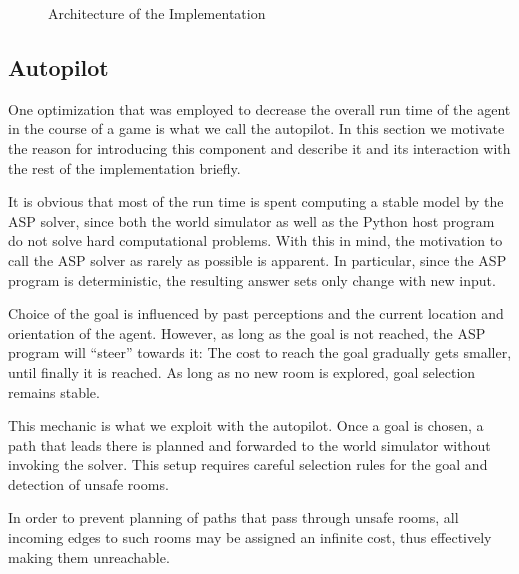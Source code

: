 \documentclass{llncs}
\begin{document}
\begin{figure}
\begin{center}

\end{center}
\caption{Architecture of the Implementation}
\label{fig:architecture}
\end{figure}

\subsection{Autopilot}

One optimization that was employed to decrease the overall run time of the agent in the course of a game is what we call the autopilot. In this section we motivate the reason for introducing this component and describe it and its interaction with the rest of the implementation briefly.

It is obvious that most of the run time is spent computing a stable model by the ASP solver, since both the world simulator as well as the Python host program do not solve hard computational problems. With this in mind, the motivation to call the ASP solver as rarely as possible is apparent. In particular, since the ASP program is deterministic, the resulting answer sets only change with new input.

Choice of the goal is influenced by past perceptions and the current location and orientation of the agent. However, as long as the goal is not reached, the ASP program will \enquote{steer} towards it: The cost to reach the goal gradually gets smaller, until finally it is reached. As long as no new room is explored, goal selection remains stable.

This mechanic is what we exploit with the autopilot. Once a goal is chosen, a path that leads there is planned and forwarded to the world simulator without invoking the solver. This setup requires careful selection rules for the goal and detection of unsafe rooms.

In order to prevent planning of paths that pass through unsafe rooms, all incoming edges to such rooms may be assigned an infinite cost, thus effectively making them unreachable.



\end{document}
